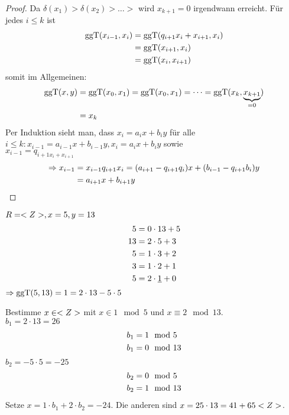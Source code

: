 \begin{proof}
	Da $\delta(x_1) > \delta(x_2) > \dots >$ wird $x_{k+1} = 0$ irgendwann erreicht. Für jedes $i \le k$ ist 
	\begin{align}
		\operatorname{ggT}(x_{i-1}, x_i) &= \operatorname{ggT}(q_{i+1}x_i + x_{i+1}, x_i)\notag \\
		&=\operatorname{ggT}(x_{i+1}, x_i) \notag \\
		&= \operatorname{ggT}(x_i, x_{i+1}) \notag
	\end{align}
	somit im Allgemeinen:
	\begin{align}
		\operatorname{ggT}(x,y) &= \operatorname{ggT}(x_0,x_1) = \operatorname{ggT}(x_0,x_1) = \dots = \operatorname{ggT}(x_k, \underbrace{x_{k+1}}_{=0})\notag \\
		&= x_k \notag
	\end{align}
	Per Induktion sieht man, dass $x_i = a_i x + b_i y$ für alle \\
	$i \le k: x_{i-1} = a_{i-1} x + b_{i-1}y, x_i = a_i x + b_i y$ sowie\\
	$x_{i-1} = q_{i+1 x_i + x_{i+1}}$\\
	\begin{align}
	\Rightarrow x_{i-1} &= x_{i-1}q_{i+1}x_i = (a_{i+1} - q_{i+1} q_i)x + (b_{i-1}-q_{i+1}b_i)y \notag\\
	&= a_{i+1}x + b_{i+1}y\notag
	\end{align}
\end{proof}

\begin{example}
	$R = <Z>, x = 5, y= 13$
	\begin{align}
	5 &= 0\cdot 13 + 5 \notag \\
	13 &= 2\cdot 5 + 3 \notag \\
	5 &= 1\cdot 3 + 2 \notag \\
	3 &= 1\cdot 2 + 1 \notag \\
	5 &= 2\cdot \underline{1} + 0 \notag \\
	\end{align}
	$\Rightarrow \operatorname{ggT}(5,13) = 1 = 2\cdot 13 - 5 \cdot 5$ %
\end{example}

\begin{example}
	Bestimme $x \in <Z>$ mit $x \in 1 \mod 5$ und $x \equiv 2 \mod 13$.\\
	$b_1 = 2 \cdot 13 = 26$
	\begin{align}
		b_1 &= 1 \mod 5 \notag \\
		b_1 &= 0 \mod 13\notag 
	\end{align}
	$b_2 = -5\cdot 5 = -25$
	\begin{align}
		b_2 &= 0 \mod 5\notag \\
		b_2 &= 1 \mod 13\notag
	\end{align}
	Setze $x = 1\cdot b_1 + 2 \cdot b_2 = -24$. Die anderen sind $x = 25\cdot 13 = 41 + 65<Z>$. %
\end{example}